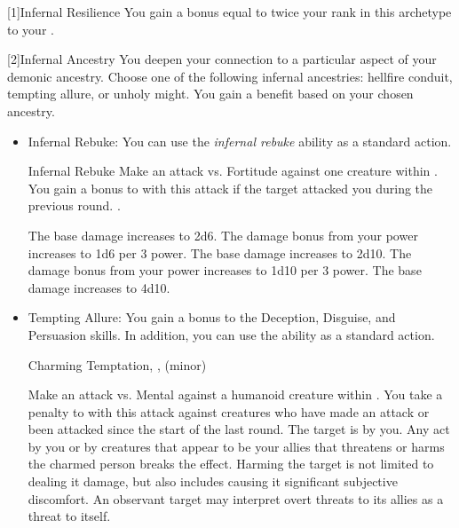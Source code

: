             [1]{Infernal Resilience} You gain a bonus equal to twice your rank in this archetype to your .

            [2]{Infernal Ancestry} You deepen your connection to a particular aspect of your demonic ancestry.
            Choose one of the following infernal ancestries: hellfire conduit, tempting allure, or unholy might.
            You gain a benefit based on your chosen ancestry.
            \begin{itemize}
                \item Infernal Rebuke: You can use the \textit{infernal rebuke} ability as a standard action.
                    \begin{magicalactiveability}{Infernal Rebuke}
                        \rankline
                        Make an attack vs. Fortitude against one creature within \shortrange.
                        You gain a  bonus to  with this attack if the target attacked you during the previous round.
                        \hit {}.

                        \rankline
                         The base damage increases to 2d6.
                         The damage bonus from your power increases to 1d6 per 3 power.
                         The base damage increases to 2d10.
                         The damage bonus from your power increases to 1d10 per 3 power.
                         The base damage increases to 4d10.
                    \end{magicalactiveability}
                \item Tempting Allure: You gain a  bonus to the Deception, Disguise, and Persuasion skills.
                    In addition, you can use the  ability as a standard action.
                    \begin{magicalsustainability}{Charming Temptation}{, ,  (minor)}
                        \rankline
                        \noindent

                        Make an attack vs. Mental against a humanoid creature within \medrange.
                        You take a  penalty to  with this attack against creatures who have made an attack or been attacked since the start of the last round.
                        \vspace{0.25em}
                        \hit The target is \charmed by you.
                        Any act by you or by creatures that appear to be your allies that threatens or harms the charmed person breaks the effect.
                        Harming the target is not limited to dealing it damage, but also includes causing it significant subjective discomfort.
                        An observant target may interpret overt threats to its allies as a threat to itself.


\end{magicalsustainability}
\end{itemize}
